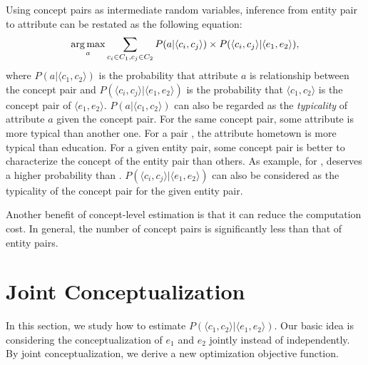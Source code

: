 Using concept pairs as intermediate random variables, inference from entity pair to attribute can be restated as the following equation:
\begin{equation}
\label{eq:target}
\operatorname*{arg\,max}_a \sum_{c_i\in C_1 , c_j \in C_2 }P(a|\langle c_{i},c_{j}\rangle)\times P(\langle c_{i},c_{j}\rangle|\langle e_{1},e_{2}\rangle),
\end{equation}
where $P(a|\langle c_{1},c_{2}\rangle)$ is the probability that attribute $a$ is relationship between the concept pair
and $P(\langle c_{i},c_{j}\rangle |\langle e_{1},e_{2}\rangle)$ is the probability that $\langle c_1, c_2\rangle$ is the concept pair of $ \langle e_1, e_2 \rangle $.
$P(a| \langle c_{1},c_{2} \rangle )$ can also be regarded as the {\it typicality} of attribute $a$ given the concept pair.
For the same concept pair, some attribute is more typical than another one.
For a pair , the attribute \ac{hometown} is more typical than \ac{education}.
For a given entity pair, some concept pair is better to characterize the concept of the entity pair than others.
As example,  for ,   deserves a higher probability than .
$P( \langle c_{i},c_{j} \rangle | \langle e_{1},e_{2} \rangle )$ can also be considered as the typicality of the concept pair for the given entity pair.


Another benefit of concept-level estimation is that it can reduce the computation cost.
In general, the number of concept pairs is significantly less than that of entity pairs.

\section{Joint Conceptualization}
In this section, we study how to estimate $ P(\langle c_1,c_2 \rangle | \langle e_1,e_2\rangle) $.
Our basic idea is considering the conceptualization of $e_1$ and $e_2$ jointly instead of independently.
By joint conceptualization, we derive a new optimization objective function.


